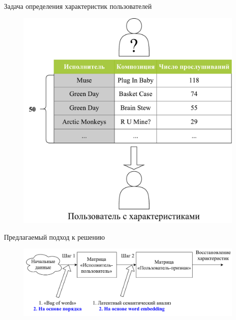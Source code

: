 \documentclass{beamer}
\begin{document}
\begin{frame}{Задача определения характеристик пользователей}
    \begin{figure}
        \includegraphics[scale=0.40]{figures/lastfm-top.pdf}
    \end{figure}
\end{frame}

\begin{frame}{Предлагаемый подход к решению}
    \begin{figure}
        \includegraphics[width=\textwidth]{figures/master-concept.pdf}
    \end{figure}
\end{frame}
\end{document}
